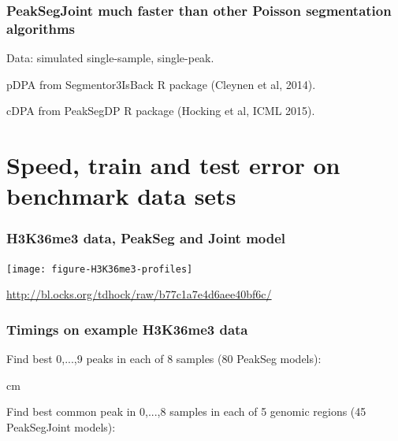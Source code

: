 \documentclass{beamer}
\begin{document}
\begin{frame}
  \frametitle{PeakSegJoint much faster than other Poisson
    segmentation algorithms}

  Data: simulated single-sample, single-peak.

   

  pDPA from Segmentor3IsBack R package (Cleynen et al, 2014).

  cDPA from PeakSegDP R package (Hocking et al, ICML 2015).

\end{frame}

\section{Speed, train and test error on benchmark data sets}

\begin{frame}
  \frametitle{H3K36me3 data, PeakSeg and Joint model}

  \texttt{[image: figure-H3K36me3-profiles]}

  \url{http://bl.ocks.org/tdhock/raw/b77c1a7e4d6aee40bf6c/}
\end{frame}

\begin{frame}
  \frametitle{Timings on example H3K36me3 data}

  \small

  Find best 0,...,9 peaks in each of 8 samples (80 PeakSeg
  models):

  \scriptsize

  

   cm

  \small

  Find best common peak in 0,...,8 samples in each of 5 genomic
  regions (45 PeakSegJoint models):

  \scriptsize

  

\end{frame}
\end{document}
